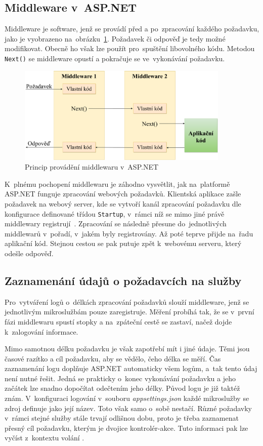 \subsection{Middleware v~ASP.NET}
Middleware je software, jenž se provádí před a po~zpracování každého požadavku, jako je vyobrazeno na~obrázku~\ref{middleware-img}. Požadavek či odpověď je tedy možné modifikovat. Obecně ho však lze použít pro~spuštění libovolného kódu. Metodou \texttt{Next()} se middleware opustí a pokračuje se ve~vykonávání požadavku.

\begin{figure}[hbt]
	\centering
	\includegraphics[width=0.9\textwidth]{obrazky/middleware.pdf}
	\caption{Princip provádění middlewaru v~ASP.NET}
	\label{middleware-img}
\end{figure}

K~plnému pochopení middlewaru je záhodno vysvětlit, jak na~platformě ASP.NET funguje zpracování webových požadavků. Klientská aplikace zašle požadavek na webový server, kde se vytvoří kanál zpracování požadavku dle konfigurace definované třídou \texttt{Startup}, v~rámci níž se mimo jiné právě middlewary registrují~\cite{middleware}. Zpracování se následně přesune do~jednotlivých middlewarů v~pořadí, v~jakém byly registrovány. Až poté teprve přijde na~řadu aplikační kód. Stejnou cestou se pak putuje zpět k~webovému serveru, který odešle odpověď. 

\subsection{Zaznamenání údajů o požadavcích na služby}
\label{zaznamenani-udaju-o-pozadavcich-na-sluzby}
Pro~vytváření logů o~délkách zpracování požadavků slouží middleware, jenž se jednotlivým mikroslužbám pouze zaregistruje. Měření probíhá tak, že se v~první fázi middlewaru spustí stopky a na~zpáteční cestě se zastaví, načež dojde k~zalogování informace.

Mimo samotnou délku požadavku je však zapotřebí mít i jiné údaje. Těmi jsou časové razítko a cíl požadavku, aby se vědělo, čeho délka se měří. Čas zaznamenání logu doplňuje ASP.NET automaticky všem logům, a~tak tento údaj není nutné řešit. Jedná se prakticky o~konec vykonávání požadavku a jeho začátek lze snadno dopočítat odečtením jeho délky. Původ logu je již taktéž znám. V~konfiguraci logování v~souboru \emph{appsettings.json} každé mikroslužby se zdroj definuje jako její název. Toto však samo o~sobě nestačí. Různé požadavky v~rámci stejné služby stále trvají odlišnou dobu, proto je třeba zaznamenat přesný cíl požadavku, kterým je dvojice kontrolér-akce. Tuto informaci pak lze vyčíst z~kontextu volání \cite{route-data}.


